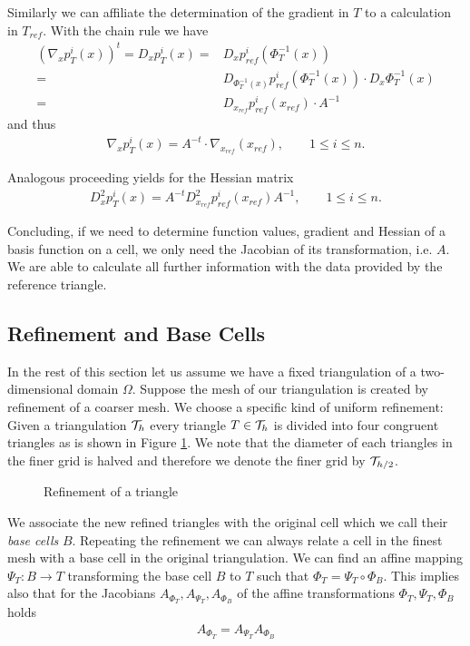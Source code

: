 \begin{example}
Similarly we can affiliate the determination of the gradient in $T$ to a calculation in $T_{ref}$. With the chain rule we have
\begin{align*}
	\left(\nabla_x p_T^i(x)\right)^t = D_x p_T^i(x) =& D_x p^i_{ref}(\Phi_T^{-1}(x)) \\
	  =& D_{\Phi_T^{-1}(x)}p^i_{ref}(\Phi_T^{-1}(x)) \cdot D_x  \Phi_T^{-1}(x) \\
	  =& D_{x_{ref}}p^i_{ref}(x_{ref}) \cdot  A^{-1}
\end{align*}
and thus
\begin{align}
	\nabla_x p_T^i(x) = A^{-t} \cdot \nabla_{x_{ref}}(x_{ref}), \qquad 1 \leq i \leq n. \label{eq: ref gradient}
\end{align}

Analogous proceeding yields for the Hessian matrix
\begin{align}
D_x^2p_T^i(x) = A^{-t} D_{x_{ref}}^2p^i_{ref}(x_{ref})  A^{-1}, \qquad 1 \leq i \leq n.
\end{align}

Concluding, if we need to determine function values, gradient and Hessian of a basis function on a cell, we only need the Jacobian of its transformation, i.e. $A$. We are able to calculate all further information with the data provided by the reference triangle.
\end{example}

\subsection{Refinement and Base Cells}\label{subsec: refinement and base cells}
In the rest of this section let us assume we have a fixed triangulation of a two-dimensional domain $\Omega$. 
Suppose the mesh of our triangulation is created by refinement of a coarser mesh. We choose a specific kind of uniform refinement: Given a triangulation $\mathcal{T}_h$ every triangle $T \in \mathcal{T}_h$ is divided into four congruent triangles as is shown in Figure \ref{pic: refinement}. We note that the diameter of each triangles in the finer grid is halved and therefore we denote the finer grid by $\mathcal{T}_{h/2}$. %

\begin{figure}[h]

\caption{Refinement of a triangle}
 \label{pic: refinement}
\end{figure}

We associate the new refined triangles with the original cell which we call their \emph{base cells} $B$. Repeating the refinement we can always relate a cell in the finest mesh with a base cell in the original triangulation. We can find an affine mapping $\Psi_T:B \rightarrow T$ transforming the base cell $B$ to $T$ such that $\Phi_T = \Psi_T \circ \Phi_B$. This implies also that for the Jacobians $A_{\Phi_T}, A_{\Psi_T}, A_{\Phi_B}$ of the affine transformations $\Phi_T, \Psi_T,\Phi_B$ holds
\begin{align}
A_{\Phi_T}=A_{\Psi_T} A_{\Phi_B}
\end{align} 

